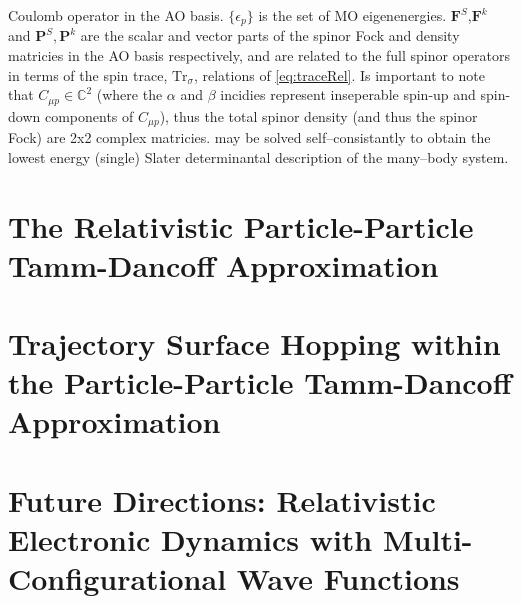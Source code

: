 \documentclass[12pt]{article}
\newcommand*\vc[1]{\boldsymbol{#1}}
\begin{document}
Coulomb operator in the AO basis. $\{\epsilon_p\}$ is the set of MO
eigenenergies. $\vc{F}^S$,$\vc{F}^k$ and $\vc{P}^S,\vc{P}^k$ are the scalar and
vector parts of the spinor Fock and density matricies in the AO basis
respectively, and are related to the full spinor operators in terms of the spin
trace, $\mathrm{Tr}_\sigma$, relations of \cref{eq:traceRel}. Is important to
note that $C_{\mu p} \in \mathbb{C}^2$ (where the $\alpha$ and $\beta$ incidies
represent inseperable spin-up and spin-down components of $C_{\mu p}$), thus the
total spinor density (and thus the spinor Fock) are 2x2 complex matricies.
 may be solved self--consistantly to obtain the lowest energy
(single) Slater determinantal description of the many--body system.


\section{The Relativistic Particle-Particle Tamm-Dancoff Approximation}
\label{sec:pp-X2C}
\section{Trajectory Surface Hopping within the Particle-Particle Tamm-Dancoff Approximation}
\label{sec:pp-TSH}
\section{Future Directions: Relativistic Electronic Dynamics with Multi-Configurational Wave Functions}
\label{sec:Future}


\end{document}
